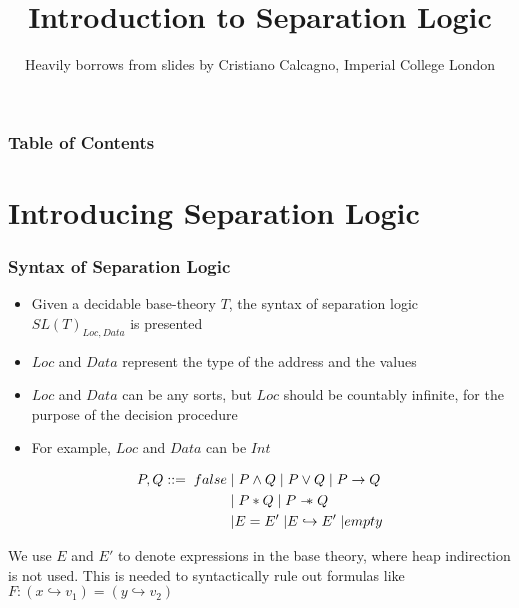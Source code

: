 \documentclass{beamer}
\title %
{Introduction to Separation Logic}
\author[\footnote{Heavily}]%
{Heavily borrows from slides by Cristiano Calcagno, Imperial College London}
\newcommand\sepimp{\mathrel{-\mkern-6mu*}}
\begin{document}
\frame{\titlepage}



\begin{frame}
\frametitle{Table of Contents}
\tableofcontents
\end{frame}


\section{Introducing Separation Logic}

\begin{frame}
\frametitle{Syntax of Separation Logic}
\begin{itemize}
\item Given a decidable base-theory $T$, the syntax of separation logic $SL(T)_{Loc,Data}$ is presented
\item $Loc$ and $Data$ represent the type of the address and the values
\item $Loc$ and $Data$ can be any sorts, but $Loc$ should be countably
    infinite, for the purpose of the decision procedure
\item For example, $Loc$ and $Data$ can be $Int$
\end{itemize}

\begin{align*}
    P,Q ::= \; false \;
          & \lvert \; P \land Q \;
          \lvert \; P \lor Q \;
          \lvert \; P \to Q \\
          & \lvert \; P * Q \;
            \lvert \; P \sepimp Q \\
          & \lvert E = E' \;
            \lvert E \hookrightarrow E' \;
            \lvert empty
\end{align*}

We use $E$ and $E'$ to denote expressions in the base theory,
where heap indirection is not used. This is needed to syntactically
rule out formulas like $F : (x \hookrightarrow v_1) = (y \hookrightarrow v_2)$
\end{frame}
\end{document}
